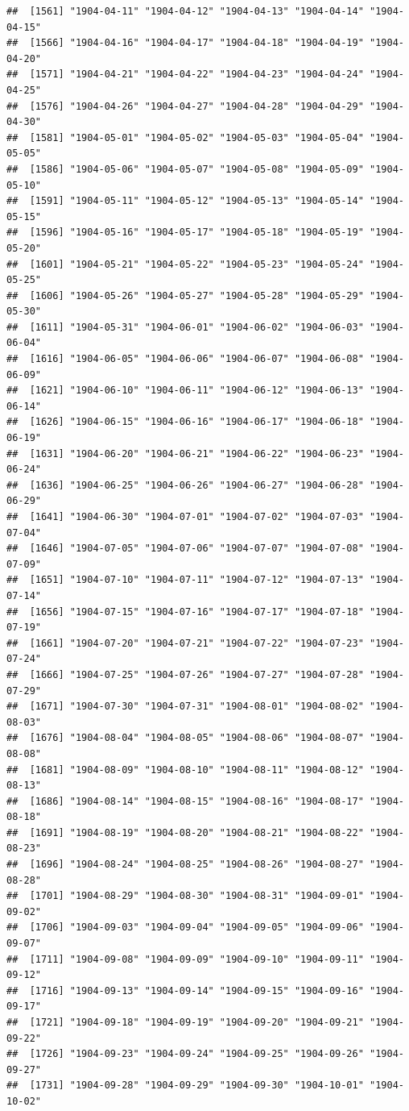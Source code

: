 \documentclass{article}\usepackage[]{graphicx}\usepackage[]{color}
\makeatletter
\newenvironment{kframe}{%
 \def\at@end@of@kframe{}%
 \ifinner\ifhmode%
  \def\at@end@of@kframe{\end{minipage}}%
  \begin{minipage}{\columnwidth}%
 \fi\fi%
 \def\FrameCommand##1{\hskip\@totalleftmargin \hskip-\fboxsep
 \colorbox{shadecolor}{##1}\hskip-\fboxsep
     \hskip-\linewidth \hskip-\@totalleftmargin \hskip\columnwidth}%
 \MakeFramed {\advance\hsize-\width
   \@totalleftmargin\z@ \linewidth\hsize
   \@setminipage}}%
 {\par\unskip\endMakeFramed%
 \at@end@of@kframe}
\newenvironment{knitrout}{}{} %
\makeatother
\begin{document}
\begin{description}
\begin{knitrout}
\begin{kframe}
\begin{verbatim}
##  [1561] "1904-04-11" "1904-04-12" "1904-04-13" "1904-04-14" "1904-04-15"
##  [1566] "1904-04-16" "1904-04-17" "1904-04-18" "1904-04-19" "1904-04-20"
##  [1571] "1904-04-21" "1904-04-22" "1904-04-23" "1904-04-24" "1904-04-25"
##  [1576] "1904-04-26" "1904-04-27" "1904-04-28" "1904-04-29" "1904-04-30"
##  [1581] "1904-05-01" "1904-05-02" "1904-05-03" "1904-05-04" "1904-05-05"
##  [1586] "1904-05-06" "1904-05-07" "1904-05-08" "1904-05-09" "1904-05-10"
##  [1591] "1904-05-11" "1904-05-12" "1904-05-13" "1904-05-14" "1904-05-15"
##  [1596] "1904-05-16" "1904-05-17" "1904-05-18" "1904-05-19" "1904-05-20"
##  [1601] "1904-05-21" "1904-05-22" "1904-05-23" "1904-05-24" "1904-05-25"
##  [1606] "1904-05-26" "1904-05-27" "1904-05-28" "1904-05-29" "1904-05-30"
##  [1611] "1904-05-31" "1904-06-01" "1904-06-02" "1904-06-03" "1904-06-04"
##  [1616] "1904-06-05" "1904-06-06" "1904-06-07" "1904-06-08" "1904-06-09"
##  [1621] "1904-06-10" "1904-06-11" "1904-06-12" "1904-06-13" "1904-06-14"
##  [1626] "1904-06-15" "1904-06-16" "1904-06-17" "1904-06-18" "1904-06-19"
##  [1631] "1904-06-20" "1904-06-21" "1904-06-22" "1904-06-23" "1904-06-24"
##  [1636] "1904-06-25" "1904-06-26" "1904-06-27" "1904-06-28" "1904-06-29"
##  [1641] "1904-06-30" "1904-07-01" "1904-07-02" "1904-07-03" "1904-07-04"
##  [1646] "1904-07-05" "1904-07-06" "1904-07-07" "1904-07-08" "1904-07-09"
##  [1651] "1904-07-10" "1904-07-11" "1904-07-12" "1904-07-13" "1904-07-14"
##  [1656] "1904-07-15" "1904-07-16" "1904-07-17" "1904-07-18" "1904-07-19"
##  [1661] "1904-07-20" "1904-07-21" "1904-07-22" "1904-07-23" "1904-07-24"
##  [1666] "1904-07-25" "1904-07-26" "1904-07-27" "1904-07-28" "1904-07-29"
##  [1671] "1904-07-30" "1904-07-31" "1904-08-01" "1904-08-02" "1904-08-03"
##  [1676] "1904-08-04" "1904-08-05" "1904-08-06" "1904-08-07" "1904-08-08"
##  [1681] "1904-08-09" "1904-08-10" "1904-08-11" "1904-08-12" "1904-08-13"
##  [1686] "1904-08-14" "1904-08-15" "1904-08-16" "1904-08-17" "1904-08-18"
##  [1691] "1904-08-19" "1904-08-20" "1904-08-21" "1904-08-22" "1904-08-23"
##  [1696] "1904-08-24" "1904-08-25" "1904-08-26" "1904-08-27" "1904-08-28"
##  [1701] "1904-08-29" "1904-08-30" "1904-08-31" "1904-09-01" "1904-09-02"
##  [1706] "1904-09-03" "1904-09-04" "1904-09-05" "1904-09-06" "1904-09-07"
##  [1711] "1904-09-08" "1904-09-09" "1904-09-10" "1904-09-11" "1904-09-12"
##  [1716] "1904-09-13" "1904-09-14" "1904-09-15" "1904-09-16" "1904-09-17"
##  [1721] "1904-09-18" "1904-09-19" "1904-09-20" "1904-09-21" "1904-09-22"
##  [1726] "1904-09-23" "1904-09-24" "1904-09-25" "1904-09-26" "1904-09-27"
##  [1731] "1904-09-28" "1904-09-29" "1904-09-30" "1904-10-01" "1904-10-02"

\end{verbatim}
\end{kframe}
\end{knitrout}
\end{description}
\end{document}
